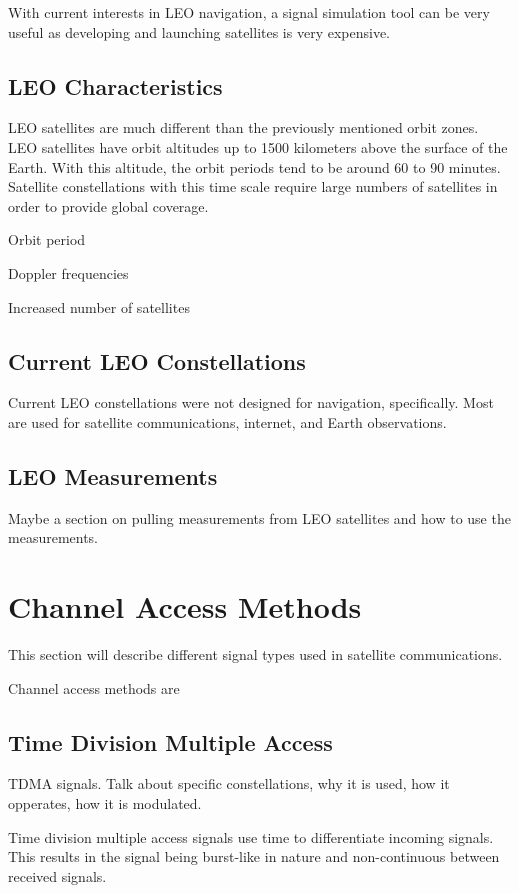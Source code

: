 \documentclass[12pt]{report}
\begin{document}
With current interests in LEO navigation, a signal simulation tool can be very useful as developing and launching satellites is very expensive.
\subsection{LEO Characteristics}

LEO satellites are much different than the previously mentioned orbit zones. LEO satellites have orbit altitudes up to 1500 kilometers above the surface of the Earth. With this altitude, the orbit periods tend to be around 60 to 90 minutes. Satellite constellations with this time scale require large numbers of satellites in order to provide global coverage.

Orbit period

Doppler frequencies

Increased number of satellites

\subsection{Current LEO Constellations}
Current LEO constellations were not designed for navigation, specifically. Most are used for satellite communications, internet, and Earth observations. 

\subsection{LEO Measurements}
Maybe a section on pulling measurements from LEO satellites and how to use the measurements. 

\section{Channel Access Methods}
This section will describe different signal types used in satellite communications.

Channel access methods are 
\subsection{Time Division Multiple Access}
TDMA signals. Talk about specific constellations, why it is used, how it opperates, how it is modulated. 

Time division multiple access signals use time to differentiate incoming signals. This results in the signal being burst-like in nature and non-continuous between received signals. 
\end{document}
